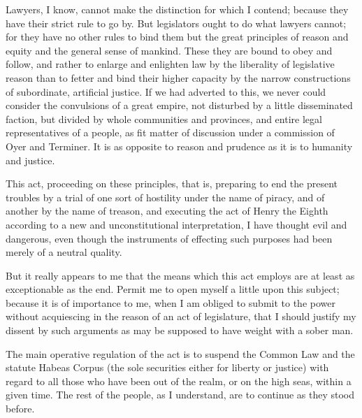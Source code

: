 Lawyers, I know, cannot make the distinction for which I contend; because they have their strict rule to go by. But legislators ought to do what lawyers cannot; for they have no other rules to bind them but the great principles of reason and equity and the general sense of mankind. These they are bound to obey and follow, and rather to enlarge and enlighten law by the liberality of legislative reason than to fetter and bind their higher capacity by the narrow constructions of subordinate, artificial justice. If we had adverted to this, we never could consider the convulsions of a great empire, not disturbed by a little disseminated faction, but divided by whole communities and provinces, and entire legal representatives of a people, as fit matter of discussion under a commission of Oyer and Terminer. It is as opposite to reason and prudence as it is to humanity and justice.

This act, proceeding on these principles, that is, preparing to end the present troubles by a trial of one sort of hostility under the name of piracy, and of another by the name of treason, and executing the act of Henry the Eighth according to a new and unconstitutional interpretation, I have thought evil and dangerous, even though the instruments of effecting such purposes had been merely of a neutral quality.

But it really appears to me that the means which this act employs are at least as exceptionable as the end. Permit me to open myself a little upon this subject; because it is of importance to me, when I am obliged to submit to the power without acquiescing in the reason of an act of legislature, that I should justify my dissent by such arguments as may be supposed to have weight with a sober man.

The main operative regulation of the act is to suspend the Common Law and the statute Habeas Corpus (the sole securities either for liberty or justice) with regard to all those who have been out of the realm, or on the high seas, within a given time. The rest of the people, as I understand, are to continue as they stood before.

